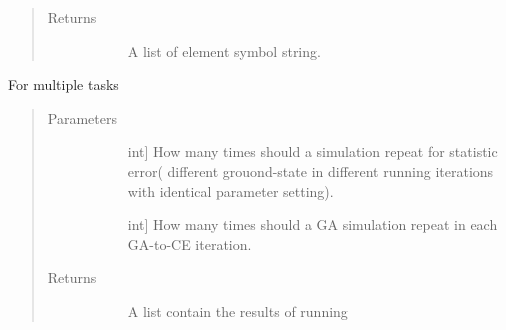 \documentclass[letterpaper,10pt,english]{sphinxmanual}
\begin{document}
\begin{fulllineitems}
\begin{fulllineitems}
\begin{quote}
\begin{description}
\item[{Returns}] \leavevmode\begin{description}
\item[{}] \leavevmode
A list of element symbol string.

\end{description}

\end{description}\end{quote}

\end{fulllineitems}


\begin{fulllineitems}
\label{\detokenize{pygace.examples.sto:pygace.examples.sto.sto_gace.STOApp.multiple_run}}
For multiple tasks
\begin{quote}\begin{description}
\item[{Parameters}] \leavevmode\begin{description}
\item[{}] \leavevmode{[}int{]}
How many times should a simulation repeat for statistic error(
different grouond-state in different running iterations with
identical parameter setting).

\item[{}] \leavevmode{[}int{]}
How many times should a GA simulation repeat in each GA-to-CE
iteration.

\end{description}

\item[{Returns}] \leavevmode\begin{description}
\item[{}] \leavevmode
A list contain the results of running

\end{description}

\end{description}\end{quote}

\end{fulllineitems}



\end{fulllineitems}
\end{document}
